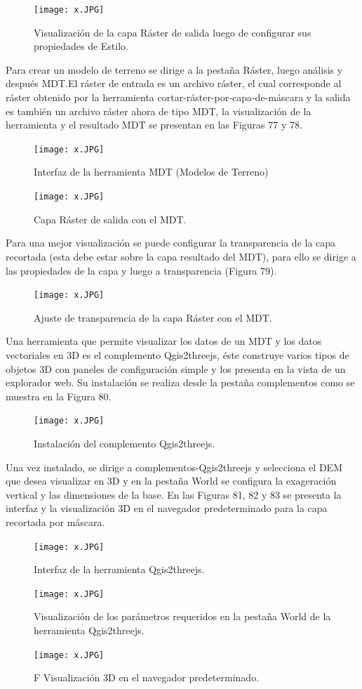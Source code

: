 \documentclass[12pt,hidelinks]{article}
\begin{document}
\begin{figure}[H]
    \centering
    \texttt{[image: x.JPG]}
    \caption{Visualización de la capa Ráster de salida luego de configurar sus propiedades de Estilo. }
 \label{fig:my_label}
\end{figure}
Para crear un modelo de terreno se dirige a la pestaña Ráster, luego análisis y después MDT.El ráster de entrada es un archivo ráster, el cual corresponde al ráster obtenido por la herramienta cortar-ráster-por-capa-de-máscara y la salida es también un archivo ráster ahora de tipo MDT, la visualización de la herramienta y el resultado MDT se presentan en las Figuras 77 y 78.
\begin{figure}[H]
    \centering
    \texttt{[image: x.JPG]}
    \caption{Interfaz de la herramienta MDT (Modelos de Terreno) }
 \label{fig:my_label}
\end{figure}
\begin{figure}[H]
    \centering
    \texttt{[image: x.JPG]}
    \caption{Capa Ráster de salida con el MDT. }
 \label{fig:my_label}
\end{figure}
Para una mejor visualización se puede configurar la transparencia de la capa recortada (esta debe estar sobre la capa resultado del MDT), para ello se dirige a las propiedades de la capa y luego a transparencia (Figura 79).
\begin{figure}[H]
    \centering
    \texttt{[image: x.JPG]}
    \caption{Ajuste de transparencia de la capa Ráster con el MDT. }
 \label{fig:my_label}
\end{figure}
Una herramienta que permite visualizar los datos de un MDT y los datos vectoriales en 3D es el complemento Qgis2threejs, éste construye varios tipos de objetos 3D con paneles de configuración simple y los presenta en la vista de un explorador web. Su instalación se realiza desde la pestaña complementos como se muestra en la Figura 80.
\begin{figure}[H]
    \centering
    \texttt{[image: x.JPG]}
    \caption{Instalación del complemento Qgis2threejs. }
 \label{fig:my_label}
\end{figure}
Una vez instalado, se dirige a complementos-Qgis2threejs y selecciona el DEM que desea visualizar en 3D y en la pestaña World se configura la exageración vertical y las dimensiones de la base. En las Figuras 81, 82 y 83 se presenta la interfaz y la visualización 3D en el navegador predeterminado para la capa recortada por máscara.
\begin{figure}[H]
    \centering
    \texttt{[image: x.JPG]}
    \caption{Interfaz de la herramienta Qgis2threejs. }
 \label{fig:my_label}
\end{figure}
\begin{figure}[H]
    \centering
    \texttt{[image: x.JPG]}
    \caption{Visualización de los parámetros requeridos en la pestaña World de la herramienta Qgis2threejs. }
 \label{fig:my_label}
\end{figure}
\begin{figure}[H]
    \centering
    \texttt{[image: x.JPG]}
    \caption{F Visualización 3D en el navegador predeterminado. }
 \label{fig:my_label}
\end{figure}
\end{document}
